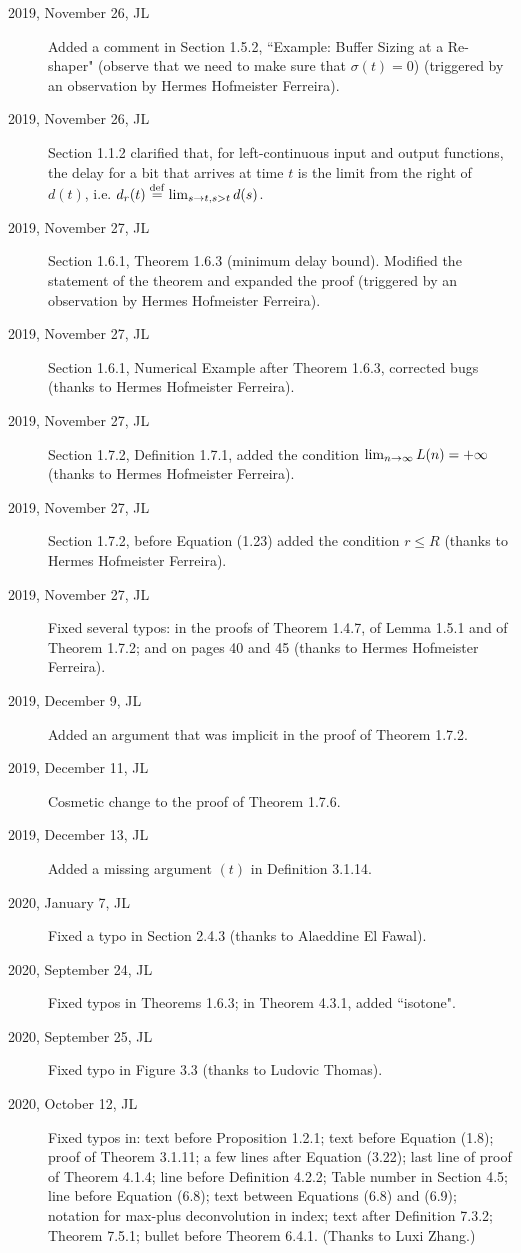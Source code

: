 \documentclass[11pt,twoside,onecolumn,a4paper]{book}
\begin{document}
\begin{description}
   \item[2019, November 26, JL] Added a comment in Section 1.5.2, ``Example: Buffer Sizing at a Re-shaper" (observe that we
need to make sure that $\sigma(t) = 0$) (triggered by an observation by Hermes Hofmeister Ferreira).
    \item[2019, November 26, JL] Section 1.1.2 clarified that, for left-continuous input and output functions, the delay for a bit that arrives at time $t$ is the limit from the right of $d(t)$, i.e. $d_r(t)\stackrel{\mathrm{def}}{=}\lim_{s \rightarrow t, s>t}d(s)$.
    \item[2019, November 27, JL] Section 1.6.1, Theorem 1.6.3 (minimum delay bound). Modified the statement of the theorem and expanded the proof (triggered by an observation by Hermes Hofmeister Ferreira).
    \item[2019, November 27, JL] Section 1.6.1, Numerical Example after Theorem 1.6.3, corrected bugs (thanks to Hermes Hofmeister Ferreira).
     \item[2019, November 27, JL] Section 1.7.2, Definition 1.7.1, added the condition $\lim_{n \rightarrow \infty}L(n)=+\infty$ (thanks to Hermes Hofmeister Ferreira).

     \item[2019, November 27, JL] Section 1.7.2, before Equation (1.23) added the condition $r\leq R$ (thanks to Hermes Hofmeister Ferreira).

     \item[2019, November 27, JL] Fixed several typos: in the proofs of Theorem 1.4.7, of Lemma 1.5.1 and of Theorem 1.7.2; and on pages 40 and 45 (thanks to Hermes Hofmeister Ferreira).
     \item[2019, December 9, JL] Added an argument that was implicit in the proof of Theorem 1.7.2.
     \item[2019, December 11, JL] Cosmetic change to the proof of Theorem 1.7.6.
    \item[2019, December 13, JL] Added a missing argument $(t)$ in Definition 3.1.14.
        \item[2020, January 7, JL] Fixed a typo in Section 2.4.3 (thanks to Alaeddine El Fawal).
    \item[2020, September 24, JL] Fixed typos in Theorems 1.6.3; in Theorem 4.3.1, added ``isotone".

    \item[2020, September 25, JL] Fixed typo in Figure 3.3 (thanks to Ludovic Thomas).
    \item[2020, October 12, JL] Fixed typos in: text before Proposition 1.2.1; text before Equation (1.8); proof of Theorem 3.1.11; a few lines after Equation (3.22); last line of proof of Theorem 4.1.4; line before Definition 4.2.2; Table number in Section 4.5; line before Equation (6.8); text between Equations (6.8) and (6.9); notation for max-plus deconvolution in index; text after Definition 7.3.2; Theorem 7.5.1; bullet before Theorem 6.4.1.
        (Thanks to Luxi Zhang.)


\end{description}
\end{document}
